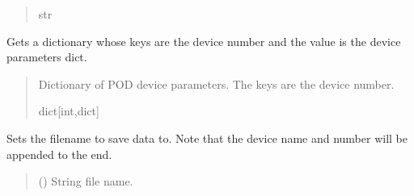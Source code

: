 \documentclass[letterpaper,10pt,english]{sphinxmanual}
\begin{document}
\begin{fulllineitems}
\begin{fulllineitems}
\begin{quote}
\begin{description}
\sphinxAtStartPar
str

\end{description}\end{quote}

\end{fulllineitems}


\begin{fulllineitems}
\label{\detokenize{Setup_PodInterface:Setup_PodInterface.Setup_Interface.GetPODparametersDict}}
\pysigstartsignatures
{}
\pysigstopsignatures
\sphinxAtStartPar
Gets a dictionary whose keys are the device number and the value is the device parameters dict.
\begin{quote}\begin{description}
\sphinxAtStartPar
Dictionary of POD device parameters. The keys are the device number.

\sphinxAtStartPar
dict{[}int,dict{]}

\end{description}\end{quote}

\end{fulllineitems}


\begin{fulllineitems}
\label{\detokenize{Setup_PodInterface:Setup_PodInterface.Setup_Interface.SetFileName}}
\pysigstartsignatures
{}
\pysigstopsignatures
\sphinxAtStartPar
Sets the filename to save data to. Note that the device name and number will be appended         to the end.
\begin{quote}\begin{description}
\sphinxAtStartPar
{} () \textendash{} String file name.


\end{description}
\end{quote}
\end{fulllineitems}
\end{fulllineitems}
\end{document}
